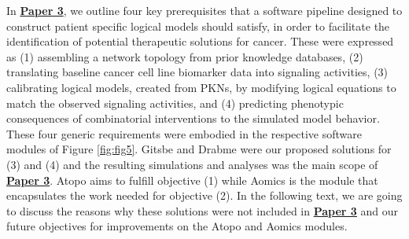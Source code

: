 \documentclass[
  12pt,
]{book}
\begin{document}
In \textbf{\protect\hyperlink{Paper3}{Paper 3}}, we outline four key prerequisites that a software pipeline designed to construct patient specific logical models should satisfy, in order to facilitate the identification of potential therapeutic solutions for cancer.
These were expressed as (1) assembling a network topology from prior knowledge databases, (2) translating baseline cancer cell line biomarker data into signaling activities, (3) calibrating logical models, created from PKNs, by modifying logical equations to match the observed signaling activities, and (4) predicting phenotypic consequences of combinatorial interventions to the simulated model behavior.
These four generic requirements were embodied in the respective software modules of Figure \ref{fig:fig5}.
Gitsbe and Drabme were our proposed solutions for (3) and (4) and the resulting simulations and analyses was the main scope of \textbf{\protect\hyperlink{Paper3}{Paper 3}}.
Atopo aims to fulfill objective (1) while Aomics is the module that encapsulates the work needed for objective (2).
In the following text, we are going to discuss the reasons why these solutions were not included in \textbf{\protect\hyperlink{Paper3}{Paper 3}} and our future objectives for improvements on the Atopo and Aomics modules.
\end{document}
